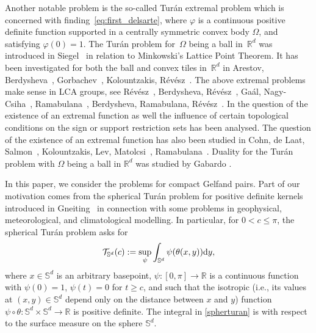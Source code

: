 \documentclass[[a4paper,english,12pt]{amsart}
\theoremstyle{plain}
\theoremstyle{remark}
\newcommand{\ff}{\varphi}
\begin{document}
Another notable problem is the so-called Tur\'an extremal problem which is concerned with finding~\eqref{eq:first_delsarte},
where $\ff$ is a continuous positive definite function supported in a centrally symmetric convex body $\Omega$, and satisfying $\ff(0)=1$. The Tur\'an problem for~$\Omega$ being a ball in~$\mathbb{R}^d$ was introduced in Siegel~\cite{siegel} in relation to Minkowski's Lattice Point Theorem. It has been investigated for both the ball and convex tiles in~$\mathbb{R}^d$ in Arestov, Berdysheva~\cite{areberd,areberd0}, Gorbachev~\cite{gorbachev}, Kolountzakis, R\'ev\'esz~\cite{kolrev}.
The above extremal problems make sense in LCA groups, see  R\'ev\'esz~\cite{reveszLCA}, Berdysheva, R\'ev\'esz~\cite{Berdysheva}, Ga\'al, Nagy-Csiha~\cite{marcell-zsuzsa}, Ramabulana~\cite{ramabulanaexistence}, Berdysheva, Ramabulana, R\'ev\'esz~\cite{BRR_Expo}. In \cite{BRR_Expo} the question of the existence of an extremal function as well the influence of certain topological conditions on the sign or support restriction sets has been analysed. The question of the existence of an extremal function has also been studied in Cohn, de Laat, Salmon~\cite{Cohn-Laat-Salmon}, Kolountzakis, Lev, Matolcsi~\cite{KLM}, Ramabulana~\cite{ramabulanaexistence}. Duality for the Tur\'an problem with $\Omega$ being a ball in $\mathbb{R}^d$ was studied by Gabardo \cite{gabardo}.

In this paper, we consider the problems for compact Gelfand pairs. Part of our motivation comes from the spherical Tur\'an problem for positive definite kernels introduced in Gneiting~\cite{gneiting} in connection with some problems in geophysical, meteorological, and climatological modelling. In particular, for $0 < c \le \pi$, the spherical Tur\'an problem asks for 
\begin{equation}\label{spherturan}
    \mathcal{T}_{\mathbb{S}^d}(c):=\sup_{\psi}\int_{\mathbb{S}^d}\psi(\theta(x,y))\textup{d}y,
\end{equation}
where $x \in \mathbb{S}^d$ is an arbitrary basepoint, $\psi: [0, \pi] \to \mathbb{R}$ is a continuous function with $\psi(0)=1$, $\psi(t)=0$ for $t \ge c$, and such that the isotropic (i.e., its values at $(x,y) \in \mathbb{S}^d$ depend only on the distance between $x$ and $y$) function $\psi \circ \theta:\mathbb{S}^d \times \mathbb{S}^d \to \mathbb{R}$ is positive definite. The integral in \eqref{spherturan} is with respect to the surface measure on the sphere $\mathbb{S}^d$.
\end{document}
